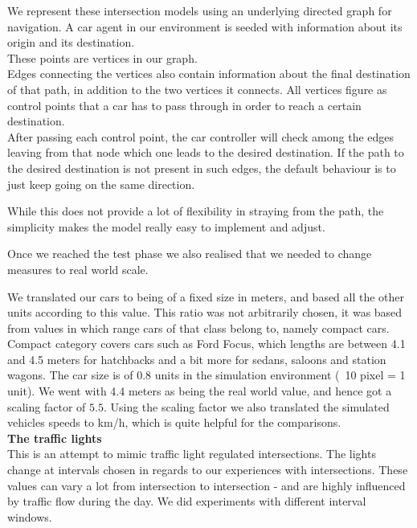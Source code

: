 
We represent these intersection models using an underlying directed graph for navigation.
 A car agent in our environment is seeded with information about its origin and its destination.\\
These points are vertices in our graph.\\
Edges connecting the vertices also contain information about the final destination of that path, in addition to the two vertices it connects.
All vertices figure as control points that a car has to pass through in order to reach a certain destination. \\
After passing each control point, the car controller will check among the edges leaving from that node which one leads to the desired destination.
If the path to the desired destination is not present in such edges, the default behaviour is to just keep going on the same direction.

While this does not provide a lot of flexibility in straying from the path, the simplicity makes the model really easy to implement and adjust.


Once we reached the test phase we also realised that we needed to change measures to real world scale.

We translated our cars to being of a fixed size in meters, and based all the other units according to this value. 
This ratio was not arbitrarily chosen, it was based from values in which range cars of that class belong to, namely compact cars.
Compact category covers cars such as Ford Focus, which lengths are between 4.1 and 4.5 meters for hatchbacks and a bit more for sedans, saloons and station wagons.
The car size is of 0.8 units in the simulation environment (~10 pixel = 1 unit).
We went with 4.4 meters as being the real world value, and hence got a scaling factor of $5.5$.
Using the scaling factor we also translated the simulated vehicles speeds to km/h, which is quite helpful for the comparisons.\\

\noindent
\textbf{The traffic lights}\\
This is an attempt to mimic traffic light regulated intersections.
The lights change at intervals chosen in regards to our experiences with intersections. 
These values can vary a lot from intersection to intersection - and are highly influenced by traffic flow during the day. 
We did experiments with different interval windows.

